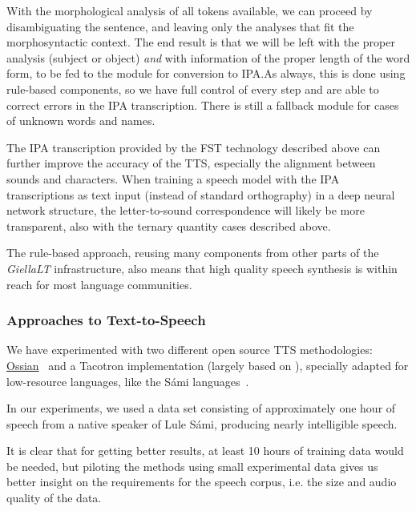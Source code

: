 \documentclass[free]{flammie}
\begin{document}
With the morphological analysis of all tokens available, we can proceed by
disambiguating the sentence, and leaving only the analyses that fit the
morphosyntactic context. The end result is that we will be left with the proper
analysis (subject or object) \textit{and} with information of the proper length
of the word form, to be fed to the module for conversion to IPA.\@  As always,
this is done using rule-based components, so we have full control of every step
and are able to correct errors in the IPA transcription. There is still a
fallback module for cases of unknown words and names.

The IPA transcription provided by the FST technology described above can further
improve the accuracy of the TTS, especially the alignment between sounds and
characters. When training a speech model with the IPA transcriptions as text
input (instead of standard orthography) in a deep neural network structure, the
letter-to-sound correspondence will likely be more transparent, also with the
ternary quantity cases described above.

The rule-based approach, reusing many components from other parts of the
\textit{GiellaLT} infrastructure, also means that high quality speech synthesis
is within reach for most language communities.


\subsubsection{Approaches to Text-to-Speech}



We have experimented with two different open source TTS methodologies:
\href{https://github.com/CSTR-Edinburgh/Ossian}{Ossian}~\cite{suni2014simple4all}
and a Tacotron implementation (largely based on \cite{shen2018natural}),
specially adapted for low-resource languages, like the Sámi
languages~\cite{makashova2021speech}.





In our experiments, we used a data set consisting of approximately one hour of
speech from a native speaker of Lule Sámi, producing nearly intelligible speech.

It is clear that for getting better results, at least 10 hours of training data
would be needed, but piloting the methods using small experimental data gives us
better insight on the requirements for the speech corpus, i.e. the size and
audio quality of the data.
\end{document}
